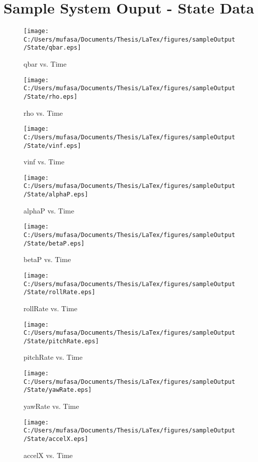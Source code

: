 \section{Sample System Ouput - State Data}
\begin{figure}[H]
	\centering
	\caption{qbar vs. Time}
		\texttt{[image: C:/Users/mufasa/Documents/Thesis/LaTex/figures/sampleOutput/State/qbar.eps]}
\end{figure}
\begin{figure}[H]
	\centering
	\caption{rho vs. Time}
		\texttt{[image: C:/Users/mufasa/Documents/Thesis/LaTex/figures/sampleOutput/State/rho.eps]}
\end{figure}
\clearpage
\begin{figure}[H]
	\centering
	\caption{vinf vs. Time}
		\texttt{[image: C:/Users/mufasa/Documents/Thesis/LaTex/figures/sampleOutput/State/vinf.eps]}
\end{figure}
\begin{figure}[H]
	\centering
	\caption{alphaP vs. Time}
		\texttt{[image: C:/Users/mufasa/Documents/Thesis/LaTex/figures/sampleOutput/State/alphaP.eps]}
\end{figure}
\begin{figure}[H]
	\centering
	\caption{betaP vs. Time}
		\texttt{[image: C:/Users/mufasa/Documents/Thesis/LaTex/figures/sampleOutput/State/betaP.eps]}
\end{figure}
\begin{figure}[H]
	\centering
	\caption{rollRate vs. Time}
		\texttt{[image: C:/Users/mufasa/Documents/Thesis/LaTex/figures/sampleOutput/State/rollRate.eps]}
\end{figure}
\begin{figure}[H]
	\centering
	\caption{pitchRate vs. Time}
		\texttt{[image: C:/Users/mufasa/Documents/Thesis/LaTex/figures/sampleOutput/State/pitchRate.eps]}
\end{figure}
\begin{figure}[H]
	\centering
	\caption{yawRate vs. Time}
		\texttt{[image: C:/Users/mufasa/Documents/Thesis/LaTex/figures/sampleOutput/State/yawRate.eps]}
\end{figure}
\begin{figure}[H]
	\centering
	\caption{accelX vs. Time}
		\texttt{[image: C:/Users/mufasa/Documents/Thesis/LaTex/figures/sampleOutput/State/accelX.eps]}
\end{figure}
